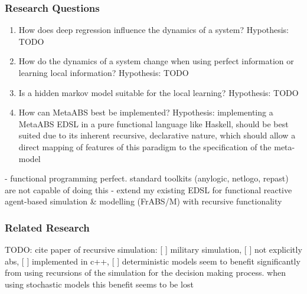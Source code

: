 \subsubsection{Research Questions} 
\begin{enumerate}
	\item How does deep regression influence the dynamics of a system? Hypothesis: TODO
	\item How do the dynamics of a system change when using perfect information or learning local information? Hypothesis: TODO
	\item Is a hidden markov model suitable for the local learning? Hypothesis: TODO
	\item How can MetaABS best be implemented? Hypothesis: implementing a MetaABS EDSL in a pure functional language like Haskell, should be best suited due to its inherent recursive, declarative nature, which should allow a direct mapping of features of this paradigm to the specification of the meta-model
\end{enumerate}

- functional programming perfect. standard toolkits (anylogic, netlogo, repast) are not capable of doing this
- extend my existing EDSL for functional reactive agent-based simulation \& modelling (FrABS/M) with recursive functionality
 
\subsubsection{Related Research}
TODO: \cite{gilmer_recursive_2000} cite paper of recursive simulation: [ ] military simulation, [ ] not explicitly abs, [ ] implemented in c++, [ ] deterministic models seem to benefit significantly from using recursions of the simulation for the decision making process. when using stochastic models this benefit seems to be lost